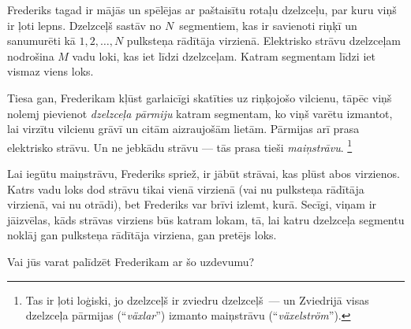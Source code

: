 \ifx\boi\undefined\fi
\def\version{jury-1}
Frederiks tagad ir mājās un spēlējas ar paštaisītu rotaļu dzelzceļu, par kuru viņš ir ļoti lepns.
Dzelzceļš sastāv no $N$~segmentiem, kas ir savienoti riņķī un sanumurēti kā $1, 2, \dots, N$ pulksteņa rādītāja virzienā.
Elektrisko strāvu dzelzceļam nodrošina $M$ vadu loki, kas iet līdzi dzelzceļam.
Katram segmentam līdzi iet vismaz viens loks.

Tiesa gan, Frederikam kļūst garlaicīgi skatīties uz riņķojošo vilcienu, tāpēc viņš nolemj pievienot \emph{dzelzceļa pārmiju}
katram segmentam, ko viņš varētu izmantot, lai virzītu vilcienu grāvī un citām aizraujošām lietām.
Pārmijas arī prasa elektrisko strāvu. Un ne jebkādu strāvu — tās prasa tieši \emph{maiņstrāvu}.%
\footnote{Tas ir ļoti loģiski, jo dzelzceļš ir zviedru dzelzceļš~--- un Zviedrijā visas dzelzceļa pārmijas
(``\emph{växlar}'') izmanto maiņstrāvu (``\emph{växelström}'').}



Lai iegūtu maiņstrāvu, Frederiks spriež, ir jābūt strāvai, kas plūst abos
virzienos. Katrs vadu loks dod strāvu tikai vienā virzienā (vai nu pulksteņa rādītāja virzienā,
vai nu otrādi), bet Frederiks var brīvi izlemt, kurā. Secīgi, viņam ir jāizvēlas,
kāds strāvas virziens būs katram lokam, tā, lai katru dzelzceļa segmentu noklāj gan pulksteņa
rādītāja virziena, gan pretējs loks.

Vai jūs varat palīdzēt Frederikam ar šo uzdevumu?

